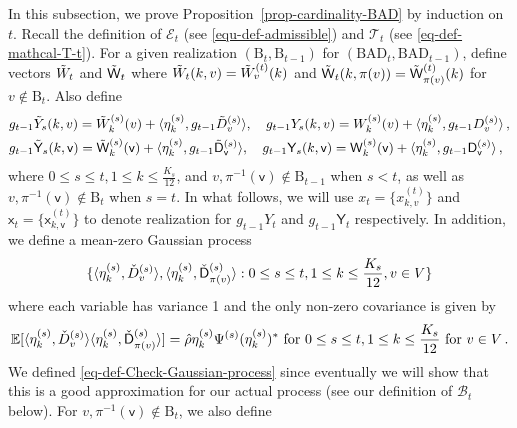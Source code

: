 \documentclass[11pt]{article}
\numberwithin{equation}{section}
\begin{document}
In this subsection, we prove Proposition~\ref{prop-cardinality-BAD} by induction on $t$. Recall the definition of $\mathcal{E}_t$ (see \eqref{equ-def-admissible}) and $\mathcal{T}_t$ (see \eqref{eq-def-mathcal-T-t}). For a given realization $(\mathrm{B}_t, \mathrm{B}_{t-1})$ for $(\mathrm{BAD}_t, \mathrm{BAD}_{t-1})$, define vectors $\Tilde{W}_t$ and $\Tilde{\mathsf{W}}_t$ where $\Tilde{W}_t(k,v) = \Tilde{W}^{(t)}_v (k)$ and $\Tilde{\mathsf{W}}_t(k,\pi(v)) = \Tilde{\mathsf{W}}^{(t)}_{\pi(v)} (k)$ for $v\not \in \mathrm{B}_{t}$. Also define
\begin{equation*}
\begin{aligned}
    & g_{t-1} \Tilde{Y}_s (k,v) = \Tilde{W}^{(s)}_k(v)+ \langle \eta^{(s)}_k, g_{t-1} \Tilde{D}^{(s)}_v \rangle, \quad g_{t-1} {Y}_s (k,v) = W^{(s)}_k(v)+ \langle \eta^{(s)}_k, g_{t-1} {D}^{(s)}_v \rangle \,, \\
    & g_{t-1} \Tilde{\mathsf{Y}}_s (k,\mathsf{v}) = \Tilde{\mathsf{W}}^{(s)}_k(\mathsf{v})+ \langle \eta^{(s)}_k, g_{t-1} \Tilde{\mathsf{D}}^{(s)}_{\mathsf{v}} \rangle, \quad g_{t-1} {\mathsf{Y}}_s (k,\mathsf{v}) = \mathsf{W}^{(s)}_k(\mathsf{v})+ \langle \eta^{(s)}_k, g_{t-1} \mathsf{D}^{(s)}_{\mathsf{v}} \rangle \,,
\end{aligned}
\end{equation*}
where $0 \leq s \leq t, 1 \leq k \leq \frac{K_s}{12}$, and $v, \pi^{-1}(\mathsf v) \not \in \mathrm{B}_{t-1}$ when $s<t$, as well as $v, \pi^{-1}(\mathsf v) \not \in \mathrm{B}_{t}$ when $s=t$. In what follows, we will use $x_t = \{ x^{(t)}_{k,v} \}$ and $\mathsf x_t = \{\mathsf{x}^{(t)}_{k,\mathsf{v}}\}$ to denote realization for $g_{t-1}Y_t$ and $g_{t-1} \mathsf{Y}_t$ respectively. In addition, we define a mean-zero Gaussian process 
\begin{equation} \label{eq-def-Check-Gaussian-process}
    \{ \langle \eta^{(s)}_k, \Check{D}^{(s)}_v \rangle, \langle \eta^{(s)}_k, \Check{\mathsf{D}}^{(s)}_{\pi(v)} \rangle : 0 \leq s \leq t, 1 \leq k \leq \frac{K_s}{12}, v \in V \}
\end{equation}
where each variable has variance 1 and the only non-zero covariance is given by
\begin{align*}
    \mathbb{E}[ \langle \eta^{(s)}_k, \Check{D}^{(s)}_v \rangle \langle \eta^{(s)}_k, \Check{\mathsf{D}}^{(s)}_{\pi(v)} \rangle ] = \Hat{\rho} \eta^{(s)}_k \Psi^{(s)} (\eta^{(s)}_k)^{*} \mbox{ for } 0 \leq s \leq t, 1 \leq k \leq \frac{K_s}{12} \mbox{ for } v \in V \,.
\end{align*}
We defined \eqref{eq-def-Check-Gaussian-process} since eventually we will show that this is a good approximation for our actual process (see our definition of $\mathcal B_t$ below). For $v, \pi^{-1}(\mathsf{v}) \not \in \mathrm{B}_{t}$, we also define
\end{document}

